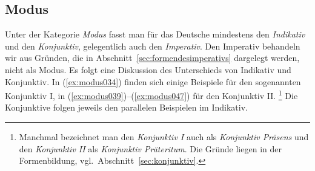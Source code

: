 \subsection{Modus}
\label{sec:modus}

Unter der Kategorie \textit{Modus} fasst man für das Deutsche mindestens den \textit{Indikativ} und den \textit{Konjunktiv}, gelegentlich auch den \textit{Imperativ}.
Den Imperativ behandeln wir aus Gründen, die in Abschnitt~\ref{sec:formendesimperativs} dargelegt werden, nicht als Modus.
Es folgt eine Diskussion des Unterschieds von Indikativ und Konjunktiv.
In (\ref{ex:modus034}) finden sich einige Beispiele für den sogenannten Konjunktiv I, in (\ref{ex:modus039})--(\ref{ex:modus047}) für den Konjunktiv II.%
\footnote{Manchmal bezeichnet man den \textit{Konjunktiv I} auch als \textit{Konjunktiv Präsens} und den \textit{Konjunktiv II} als \textit{Konjunktiv Präteritum}.
Die Gründe liegen in der Formenbildung, vgl.\ Abschnitt~\ref{sec:konjunktiv}.}
Die Konjunktive folgen jeweils den parallelen Beispielen im Indikativ.

\begin{exe}
  \ex \label{ex:modus034}
  \begin{xlist}
  \end{xlist}
  \ex \label{ex:modus039}
  \begin{xlist}
  \end{xlist}
  \ex \label{ex:modus044}
  \begin{xlist}
  \end{xlist}
  \ex \label{ex:modus047}
  \begin{xlist}
  \end{xlist}
\end{exe}

